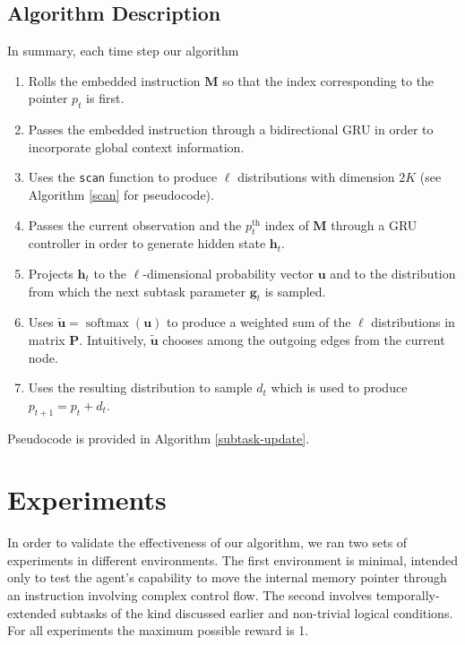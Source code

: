 \documentclass{article}
\DeclareMathOperator{\softmax}{softmax}
\begin{document}
\subsection{Algorithm Description}
In summary, each time step our algorithm 
\begin{enumerate}
  \item Rolls the embedded instruction $\mathbf{M}$ so that the index
    corresponding to the pointer $p_t$ is first.
  \item Passes the embedded instruction through a bidirectional GRU in order to
    incorporate global context information.
  \item Uses the \texttt{scan} function to produce $\ell$ distributions with
    dimension $2K$ (see Algorithm \ref{scan} for pseudocode).
  \item Passes the current observation and the $p_t^{\text{th}}$ index of
    $\mathbf{M}$ through a GRU controller in order to generate hidden state
    $\mathbf{h}_t$.
  \item Projects $\mathbf{h}_t$ to the  $\ell$-dimensional probability vector
    $\mathbf{u}$ and to the distribution from which the next subtask parameter
    $\mathbf{g}_t$ is sampled.
  \item Uses $\tilde{\mathbf{u}} = \softmax(\mathbf{u})$ to produce a weighted
    sum of the $\ell$ distributions in matrix $\mathbf{P}$. Intuitively,
    $\tilde{\mathbf{u}}$ chooses among the outgoing edges from the current node.
  \item Uses the resulting distribution to sample $d_t$ which is used to produce
    $p_{t+1} = p_t + d_t$.
\end{enumerate}
Pseudocode is provided in Algorithm \ref{subtask-update}.

\section{Experiments}
\label{experiments}
In order to validate the effectiveness of our algorithm, we ran two sets of
experiments in different environments. The first environment is minimal,
intended only to test
the agent's capability to move the internal memory pointer through an instruction
involving complex control flow. The second involves temporally-extended subtasks
of the kind discussed earlier and non-trivial logical conditions. For all
experiments the maximum possible reward is 1.
\end{document}
